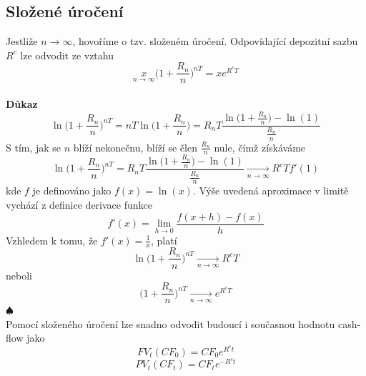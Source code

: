 \documentclass[a4paper]{book}
\begin{document}
\subsection{Složené úročení}

Jestliže $n \rightarrow \infty$, hovoříme o tzv. složeném úročení. Odpovídající depozitní sazbu $R^c$ lze odvodit ze vztahu
\begin{equation*}
\underset{n \rightarrow \infty} x \Bigg( 1 + \frac{R_n}{n} \Bigg)^{nT} = xe^{R^cT}
\end{equation*}
\\
\noindent \textbf{Důkaz}
\begin{equation*}
\ln \Bigg(1 + \frac{R_n}{n} \Bigg)^{nT} = nT \ln \Bigg(1 + \frac{R_n}{n} \Bigg) = R_n T \frac{\ln \Big( 1 + \frac{R_n}{n}\Big) - \ln(1)}{\frac{R_n}{n}}
\end{equation*}
S tím, jak se $n$ blíží nekonečnu, blíží se člen $\frac{R_n}{n}$ nule, čímž získáváme
\begin{equation*}
\ln \Bigg(1 + \frac{R_n}{n} \Bigg)^{nT} = R_n T \frac{\ln \Big( 1 + \frac{R_n}{n}\Big) - \ln(1)}{\frac{R_n}{n}} \underset{n \rightarrow \infty} \rightarrow R^cTf'(1)
\end{equation*}
kde $f$ je definováno jako $f(x) = \ln(x)$. Výše uvedená aproximace v limitě vychází z definice derivace funkce
\begin{equation*}
f'(x) = \underset{h \rightarrow 0} \lim \frac{f(x + h) - f(x)}{h}
\end{equation*}
Vzhledem k tomu, že $f'(x) = \frac{1}{x}$, platí
\begin{equation*}
\ln \Bigg( 1 + \frac{R_n}{n} \Bigg)^{nT} \underset{n \rightarrow \infty} \rightarrow R^cT
\end{equation*}
neboli
\begin{equation*}
\Bigg( 1 + \frac{R_n}{n} \Bigg)^{nT} \underset{n \rightarrow \infty} \rightarrow e^{R^cT}
\end{equation*}
\noindent $\spadesuit$\\

Pomocí složeného úročení lze snadno odvodit budoucí i současnou hodnotu cash-flow jako
\begin{equation*}
FV_t(CF_0) = CF_0 e^{R^ct}
\end{equation*}
\begin{equation*}
PV_t(CF_t) = CF_t e^{-R^ct}
\end{equation*}
\end{document}
